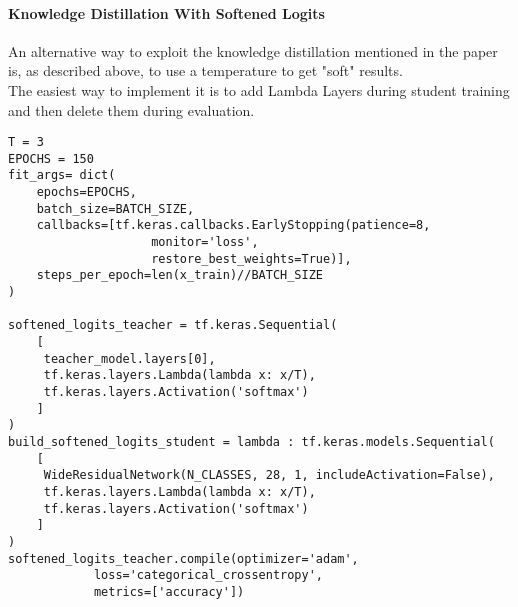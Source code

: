 \paragraph{Knowledge Distillation With Softened Logits}
An alternative way to exploit the knowledge distillation mentioned in the paper is, as described above, to use a temperature to get "soft" results.\\
The easiest way to implement it is to add Lambda Layers during student training and then delete them during evaluation.
\lstset{language=Python}
\lstset{frame=lines}
\lstset{basicstyle=\footnotesize}
\begin{lstlisting}
T = 3
EPOCHS = 150
fit_args= dict(
    epochs=EPOCHS,
    batch_size=BATCH_SIZE,
    callbacks=[tf.keras.callbacks.EarlyStopping(patience=8, 
    				monitor='loss', 
    				restore_best_weights=True)],
    steps_per_epoch=len(x_train)//BATCH_SIZE
)

softened_logits_teacher = tf.keras.Sequential(
    [
     teacher_model.layers[0],
     tf.keras.layers.Lambda(lambda x: x/T),
     tf.keras.layers.Activation('softmax')
    ]
)
build_softened_logits_student = lambda : tf.keras.models.Sequential(
    [
     WideResidualNetwork(N_CLASSES, 28, 1, includeActivation=False),
     tf.keras.layers.Lambda(lambda x: x/T),
     tf.keras.layers.Activation('softmax')
    ]
)
softened_logits_teacher.compile(optimizer='adam', 
			loss='categorical_crossentropy', 
			metrics=['accuracy'])
\end{lstlisting}
